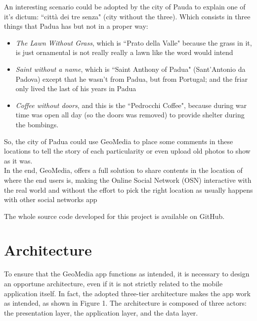 \documentclass[conference]{IEEEtran}
\begin{document}
An interesting scenario could be adopted by the city of Pauda to explain one of it's dictum: ``città dei tre senza" (city without the three).
Which consists in three things that Padua has but not in a proper way:
\begin{itemize}
    \item \textit{The Lawn Without Grass}, which is ``Prato della Valle" because the grass in it, is just ornamental is not really really a lawn like the word would intend
    \item \textit{Saint without a name}, which is ``Saint Anthony of Padua" (Sant'Antonio da Padova) except that he wasn't from Padua, but from Portugal; and the friar only lived the last of his years in Padua
    \item \textit{Coffee without doors}, and this is the ``Pedrocchi Coffee", because during war time was open all day (so the doors was removed) to provide shelter during the bombings.
\end{itemize}
So, the city of Padua could use GeoMedia to place some comments in these locations to tell the story of each particularity or even upload old photos to show as it was.
\\

In the end, GeoMedia, offers a full solution to share contents in the location of where the end users is, making the Online Social Network (OSN) interactive with the real world and without the effort to pick the right location as usually happens with other social networks app

The whole source code developed for this project is available on GitHub. \cite{gh}


\section{Architecture}\label{Architecture:panoramic}

To ensure that the GeoMedia app functions as intended, it is necessary to design an opportune architecture, even if it is not strictly related to the mobile application itself.
In fact, the adopted three-tier architecture makes the app work as intended, as shown in Figure 1.
The architecture is composed of three actors: the presentation layer, the application layer, and the data layer.
\end{document}
